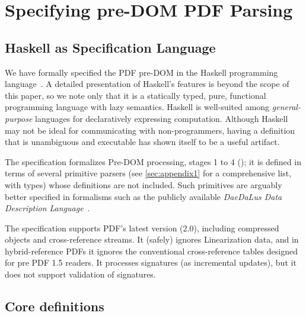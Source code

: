 \section{Specifying pre-DOM PDF Parsing}
\label{sec:specifying}

\subsection{Haskell as Specification Language}
\label{sec:spec-language}

We have formally specified the PDF pre-DOM in the Haskell programming
language~\cite{jones2003haskell}.
%
A detailed presentation of Haskell's features is beyond the scope of
this paper, so we note only that it is a statically typed, pure,
functional programming language with lazy semantics.
%
Haskell is
well-suited among \emph{general-purpose} languages for
declaratively expressing computation.
Although Haskell may not be ideal for communicating with non-programmers,
having a definition that is unambiguous and executable has shown itself
to be a useful artifact.

The specification formalizes Pre-DOM processing, stages 1 to 4
();
%
it is defined in terms of several primitive parsers (see
\cref{sec:appendix1} for a comprehensive list, with types) whose
definitions are not included.
%
Such primitives are arguably better specified in formalisms such as
the publicly available \emph{DaeDaLus Data Description
  Language}~\cite{daedalusrepo}.

The specification supports PDF's latest version (2.0), including compressed objects and cross-reference streams.
%
It (safely) ignores Linearization data, and in hybrid-reference PDFs
it ignores the conventional cross-reference tables designed for pre PDF 1.5 readers.
It processes signatures (as incremental updates), but it does not support
validation of signatures.

\subsection{Core definitions}
\label{sec:core}
\iffalse
\begin{code}
{-# LANGUAGE EmptyDataDecls, TypeOperators, LambdaCase #-}
module Spec where
import           Control.Monad
import           Data.Char
import           Data.Foldable(foldlM)
import qualified Data.IntSet as IntSet
import           Data.List
import qualified Data.Map as M
import           Data.Map(Map)
import           Types hiding (XRefEntry,SEEK,Update) -- defs dupd here!
import           Utils
import           Primitives
import           Streams
\end{code}
\fi

